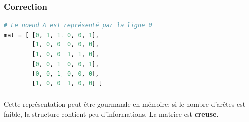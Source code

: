 \documentclass[svgnames,11pt]{beamer}
\begin{document}
\begin{frame}[fragile]
    \frametitle{Correction}
    \begin{center}
    \end{center}
    \begin{center}
        \begin{lstlisting}[language=Python , basicstyle=\ttfamily\small, xleftmargin=2em, xrightmargin=2em]
# Le noeud A est représenté par la ligne 0
mat = [ [0, 1, 1, 0, 0, 1],
        [1, 0, 0, 0, 0, 0],
        [1, 0, 0, 1, 1, 0],
        [0, 0, 1, 0, 0, 1],
        [0, 0, 1, 0, 0, 0],
        [1, 0, 0, 1, 0, 0] ]
\end{lstlisting}
        \label{CODE}
    \end{center}

\end{frame}
\begin{frame}
    \frametitle{}

    \begin{aretenir}[Observation]
        Cette représentation peut être gourmande en mémoire: si le nombre d'arêtes est faible, la structure contient peu d'informations. La matrice est \textbf{creuse}.
    \end{aretenir}

\end{frame}
\end{document}

